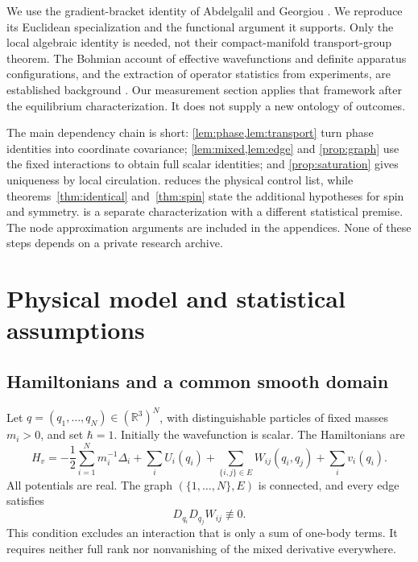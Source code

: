 \documentclass[11pt]{article}
\numberwithin{equation}{section}
\theoremstyle{definition}
\newcommand{\R}{\mathbb R}
\begin{document}
We use the gradient-bracket identity of Abdelgalil and Georgiou \cite[Proposition 1, equation (10), version 2]{AG2026}. We reproduce its Euclidean specialization and the functional argument it supports. Only the local algebraic identity is needed, not their compact-manifold transport-group theorem. The Bohmian account of effective wavefunctions and definite apparatus configurations, and the extraction of operator statistics from experiments, are established background \cite{DGZ1992,DGZ2004,DGTZ2005}. Our measurement section applies that framework after the equilibrium characterization. It does not supply a new ontology of outcomes.

The main dependency chain is short: \cref{lem:phase,lem:transport} turn phase identities into coordinate covariance; \cref{lem:mixed,lem:edge} and \cref{prop:graph} use the fixed interactions to obtain full scalar identities; and \cref{prop:saturation} gives uniqueness by local circulation.  reduces the physical control list, while theorems~\ref{thm:identical} and~\ref{thm:spin} state the additional hypotheses for spin and symmetry.  is a separate characterization with a different statistical premise. The node approximation arguments are included in the appendices. None of these steps depends on a private research archive.

\section{Physical model and statistical assumptions}\label{sec:model}

\subsection{Hamiltonians and a common smooth domain}

Let \(q=(q_1,\ldots,q_N)\in(\R^3)^N\), with distinguishable particles of fixed masses \(m_i>0\), and set \(\hbar=1\). Initially the wavefunction is scalar. The Hamiltonians are
\begin{equation}\label{eq:ham}
 H_v=-\frac12\sum_{i=1}^N m_i^{-1}\Delta_i+
 \sum_i U_i(q_i)+\sum_{\{i,j\}\in E}W_{ij}(q_i,q_j)+\sum_i v_i(q_i).
\end{equation}
All potentials are real. The graph \((\{1,\ldots,N\},E)\) is connected, and every edge satisfies
\begin{equation}\label{eq:interaction}
 D_{q_i}D_{q_j}W_{ij}\not\equiv0.
\end{equation}
This condition excludes an interaction that is only a sum of one-body terms. It requires neither full rank nor nonvanishing of the mixed derivative everywhere.
\end{document}
